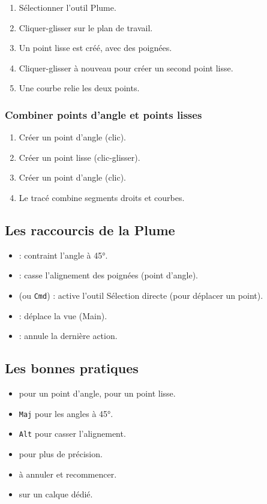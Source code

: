 \begin{enumerate}
    \item Sélectionner l'outil Plume.
    \item Cliquer-glisser sur le plan de travail.
    \item Un point lisse est créé, avec des poignées.
    \item Cliquer-glisser à nouveau pour créer un second point lisse.
    \item Une courbe relie les deux points.
\end{enumerate}

\subsubsection{Combiner points d'angle et points lisses}

\begin{enumerate}
    \item Créer un point d'angle (clic).
    \item Créer un point lisse (clic-glisser).
    \item Créer un point d'angle (clic).
    \item Le tracé combine segments droits et courbes.
\end{enumerate}

\subsection{Les raccourcis de la Plume}

\begin{itemize}
    \item {} : contraint l'angle à 45°.
    \item {} : casse l'alignement des poignées (point d'angle).
    \item {} (ou \texttt{Cmd}) : active l'outil Sélection directe (pour déplacer un point).
    \item {} : déplace la vue (Main).
    \item {} : annule la dernière action.
\end{itemize}

\subsection{Les bonnes pratiques}

\begin{itemize}
    \item {} pour un point d'angle,  pour un point lisse.
    \item {} \texttt{Maj} pour les angles à 45°.
    \item {} \texttt{Alt} pour casser l'alignement.
    \item {} pour plus de précision.
    \item {} à annuler et recommencer.
    \item {} sur un calque dédié.
\end{itemize}

